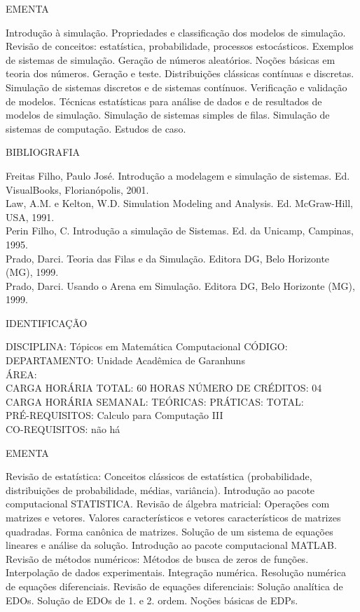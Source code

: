 \documentclass[
	12pt,				%
	openright,			%
  oneside,     %
	a4paper,			%
	english,			%
	french,				%
	spanish,			%
	brazil				%
	]{abntex2}
\begin{document}
\begin{apendicesenv}
EMENTA 

Introdução à simulação. Propriedades e classificação dos modelos de
simulação. Revisão de conceitos: estatística, probabilidade, processos
estocásticos. Exemplos de sistemas de simulação. Geração de números
aleatórios. Noções básicas em teoria dos números. Geração e teste.
Distribuições clássicas contínuas e discretas. Simulação de sistemas
discretos e de sistemas contínuos. Verificação e validação de modelos.
Técnicas estatísticas para análise de dados e de resultados de modelos
de simulação. Simulação de sistemas simples de filas. Simulação de
sistemas de computação. Estudos de caso.

BIBLIOGRAFIA 

Freitas Filho, Paulo José. Introdução a modelagem e simulação de
sistemas. Ed. VisualBooks, Florianópolis, 2001.\\
Law, A.M. e Kelton, W.D. Simulation Modeling and Analysis. Ed.
McGraw-Hill, USA, 1991.\\
Perin Filho, C. Introdução a simulação de Sistemas. Ed. da Unicamp,
Campinas, 1995.\\
Prado, Darci. Teoria das Filas e da Simulação. Editora DG, Belo
Horizonte (MG), 1999.\\
Prado, Darci. Usando o Arena em Simulação. Editora DG, Belo Horizonte
(MG), 1999.

\newpage IDENTIFICAÇÃO

DISCIPLINA: Tópicos em Matemática Computacional CÓDIGO:\\ 
DEPARTAMENTO: Unidade Acadêmica de Garanhuns\\ 
ÁREA:\\
CARGA HORÁRIA TOTAL: 60 HORAS NÚMERO DE CRÉDITOS: 04\\
CARGA HORÁRIA SEMANAL: TEÓRICAS: PRÁTICAS: TOTAL:\\
PRÉ-REQUISITOS: Calculo para Computação III\\
CO-REQUISITOS: não há

EMENTA 

Revisão de estatística: Conceitos clássicos de estatística
(probabilidade, distribuições de probabilidade, médias, variância).
Introdução ao pacote computacional STATISTICA. Revisão de álgebra
matricial: Operações com matrizes e vetores. Valores característicos e
vetores característicos de matrizes quadradas. Forma canônica de
matrizes. Solução de um sistema de equações lineares e análise da
solução. Introdução ao pacote computacional MATLAB. Revisão de métodos
numéricos: Métodos de busca de zeros de funções. Interpolação de dados
experimentais. Integração numérica. Resolução numérica de equações
diferenciais. Revisão de equações diferenciais: Solução analítica de
EDOs. Solução de EDOs de 1. e 2. ordem. Noções básicas de EDPs.


\end{apendicesenv}
\end{document}
